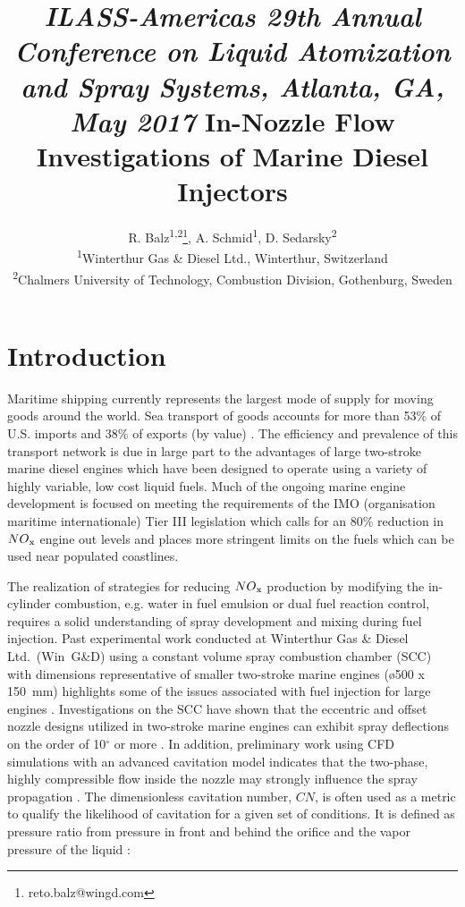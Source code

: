 \documentclass[letterpaper,twocolumn,10pt]{ilass}
\title{\vspace{-0.25in}
      {\small \em
       ILASS-Americas 29th Annual Conference on Liquid Atomization and Spray Systems,
       Atlanta, GA, May 2017} \newline\newline
      {\large\bf In-Nozzle Flow Investigations of Marine Diesel Injectors} }
\author{\large
        R. Balz\textsuperscript{1,2}\footnote{reto.balz@wingd.com},
				A. Schmid\textsuperscript{1},
				D. Sedarsky\textsuperscript{2}\\
				\textsuperscript{1}Winterthur Gas \& Diesel Ltd.,
				Winterthur,	Switzerland\\
				\textsuperscript{2}Chalmers University of Technology,
				Combustion Division, Gothenburg, Sweden}
\date{\normalsize  \centerline{\bf Abstract} \vspace{0.05in}
\begin{minipage}{6.5in} \normalsize
Injector geometries of large marine two-stroke diesel engines differ extensively from
configurations typically used in diesel engines for automotive applications.
In marine engines, the fuel enters the combustion volume radially, supplied by
multi-hole injectors with asymmetrically positioned orifices facing in similar directions. Due to this setup, the nominal direction of the orifice group
is also eccentric with respect to the central axis of the injector.
%
Experiments have shown that the sprays formed by this arrangement are asymmetric
with respect to the axis at each orifice. These strong deviations can lead
to wall wetting which increases fuel consumption, emissions, component temperatures and
contributes to loss of lubrication at the cylinder wall.
In order to investigate the in-nozzle flow and how it affects the spray morphology in this
design, experiments were carried out using transparent nozzles at injection pressures and
air densities of up to 50~MPa and 35~kg/m$^3$, respectively.
The experiments were performed with diesel fuel in a newly built ambient temperature
spray chamber which was designed to cope with significant spray backsplash.
The results discussed here were generated using an orthogonally arranged 0.75~mm diameter
mono-hole injector which matches the hole size and geometry used in large marine two-stroke
diesel engines.
%
High-speed shadowgraphy using a far-field microscope was applied to visualize cavitation
within the nozzle during the complete injection process. These imaging results are used to
compute statistical evaluations of cavitation in the nozzle over a range of conditions.
\end{minipage} \vspace{-0.25in}}
\newcommand\CN{\ensuremath{\mathit{CN}}}
\begin{document}
\ifpdf
{}
\else
{}
\fi

\maketitle

\clearpage

\setcounter{page}{2}


\section*{Introduction}
Maritime shipping currently represents the largest mode of supply for moving goods around the
world. Sea transport of goods accounts for more than 53\% of U.S. imports and 38\%
of exports (by value) \cite{Blank2012}. The efficiency and prevalence of this transport network
is due in large part to the advantages of large two-stroke marine diesel engines which have
been designed to operate using a variety of highly variable, low cost liquid fuels. 
%
Much of the ongoing marine engine development is focused on meeting the requirements of the
IMO (organisation maritime internationale) Tier III legislation which calls for an 80\%
reduction in $NO\textsubscript{x}$ engine out levels and places more stringent limits on
the fuels which can be used near populated coastlines.

The realization of strategies for reducing $NO\textsubscript{x}$ production by
modifying the in-cylinder combustion, e.g. water in fuel emulsion or dual fuel reaction control,
requires a solid understanding of spray development and mixing during fuel injection.
%
Past experimental work conducted at Winterthur Gas \& Diesel Ltd.~(Win~G\&D) using a
constant volume spray combustion chamber (SCC) with dimensions representative of
smaller two-stroke marine engines (\o 500 x 150~mm) highlights some of the issues
associated with fuel injection for large engines \cite{Herrmann2011}.
Investigations on the SCC have shown that the eccentric and offset nozzle designs utilized
in two-stroke marine engines can exhibit spray deflections on the order of
10$^{\circ}$ or more \cite{Schmid2013}.
%
In addition, preliminary work using CFD simulations with an advanced cavitation model
indicates that the two-phase, highly compressible flow inside the nozzle may strongly
influence the spray propagation \cite{Schmid2014}.\newline
%
The dimensionless cavitation number, $\CN$, is often used as a metric to qualify the
likelihood of cavitation for a given set of conditions. It is defined as pressure ratio from pressure in front and behind the orifice and the vapor pressure of the liquid \cite{Hult2016, Giannadakis2008}:
\end{document}
